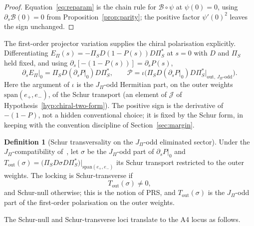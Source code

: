 \documentclass[11pt]{article}
\theoremstyle{definition}
\newtheorem{definition}{Definition}
\theoremstyle{remark}
\newcommand{\JPi}{J_{\Pi}}
\newcommand{\Pchi}{\mathcal{P}}
\newcommand{\Bsat}{\mathcal{B}}
\newcommand{\Epi}{E_{\Pi}}
\begin{document}
    \begin{proof}
      Equation~\eqref{eq:reparam} is the chain rule for $\Bsat \circ \psi$ at $\psi(0) = 0$, using $\partial_s \Bsat(0)
      = 0$
      from Proposition~\ref{prop:parity}; the positive factor $\psi'(0)^2$ leaves the sign unchanged.
    \end{proof}

    The first-order projector variation supplies the chiral polarisation explicitly.
    Differentiating $\Epi(s) = -\Pi_S D (1 - P(s)) D \Pi_S^*$ at $s = 0$ with $D$ and $\Pi_S$ held fixed, and using
    $\partial_s [-(1 - P(s))] = \partial_s P(s)$,
    \begin{equation}
      \label{eq:Pchi-schur}
      \partial_s \Epi|_{0} = \Pi_S D (\partial_s P|_{0}) D \Pi_S^* ,
      \qquad
      \Pchi = \iota\Big(\Pi_S D (\partial_s P|_{0}) D \Pi_S^* \big|_{\mathrm{out},\,\JPi\text{-odd}}\Big) .
    \end{equation}
    Here the argument of $\iota$ is the $\JPi$-odd Hermitian part, on the outer weights $\mathrm{span}(e_+,e_-)$, of the
    Schur transport (an element of $\mathcal J$ of Hypothesis~\ref{hyp:chiral-two-form}).
    The positive sign is the derivative of $-(1 - P)$, not a hidden conventional choice; it is fixed by the Schur form, in
    keeping with the convention discipline of Section~\ref{sec:margin}.

    \begin{definition}[Schur transversality on the $\JPi$-odd eliminated sector]
      \label{def:transversality}
      Under the $\JPi$-compatibility of~\cite{Beau2026prs}, let $\sigma$ be the $\JPi$-odd part of
      $\partial_s P|_{0}$ and $T_{\mathrm{out}}(\sigma)=\big(\Pi_S D\sigma D\Pi_S^*\big)\big|_{\mathrm{span}(e_+,e_-)}$
      its
      Schur transport restricted to the outer weights.
      The locking is Schur-transverse if
      \begin{equation}
        \label{eq:transversality}
        T_{\mathrm{out}}(\sigma)\neq 0 ,
      \end{equation}
      and Schur-null otherwise; this is the notion of PRS, and $T_{\mathrm{out}}(\sigma)$ is the $\JPi$-odd part of the
      first-order polarisation on the outer weights.
    \end{definition}

    The Schur-null and Schur-transverse loci translate to the A4 locus as follows.
\end{document}
